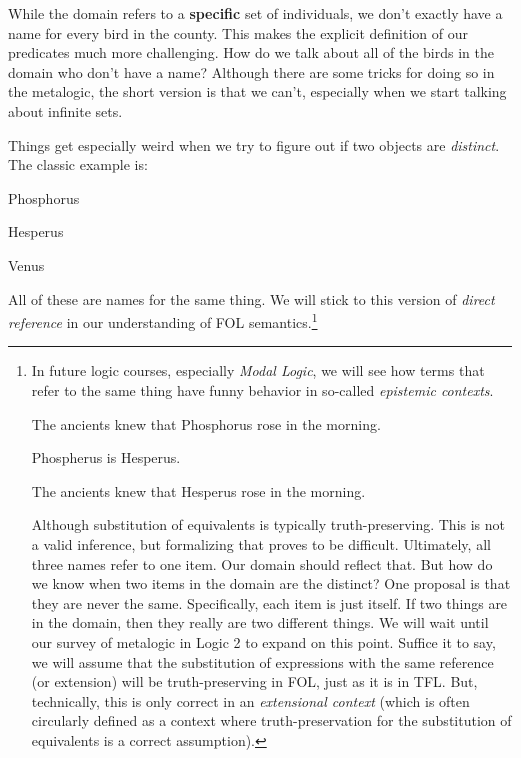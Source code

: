 While the domain refers to a \textbf{specific} set of individuals, we don't
exactly have a name for every bird in the county. This makes the explicit
definition of our predicates much more challenging. How do we talk about all
of the birds in the domain who don't have a name? Although there are some
tricks for doing so in the metalogic, the short version is that we can't,
especially when we start talking about infinite sets.

Things get especially weird when we try to figure out if two objects are
\emph{distinct}. The classic example is:

\begin{argument}
  \item[$p$:] Phosphorus
  \item[$h$:] Hesperus
  \item[$v$:] Venus
\end{argument}

All of these are names for the same thing. We will stick to this version of
\emph{direct reference} in our understanding of FOL semantics.\footnote{

  In future logic courses, especially \emph{Modal Logic}, we will see how terms
  that refer to the same thing have funny behavior in so-called \emph{epistemic
  contexts}.
  
  \begin{argument}
  \item[ ] The ancients knew that Phosphorus rose in the morning.
  \item[ ] Phospherus is Hesperus.
  \item[\therefore] The ancients knew that Hesperus rose in the morning.
  \end{argument}
  
  Although substitution of equivalents is typically truth-preserving. This is
  not a valid inference, but formalizing that proves to be difficult.
  Ultimately, all three names refer to one item. Our domain should reflect that.
  But how do we know when two items in the domain are the distinct? One
  proposal is that they are never the same. Specifically, each item is just
  itself. If two things are in the domain, then they really are two different
  things. We will wait until our survey of metalogic in Logic 2 to expand on
  this point. Suffice it to say, we will assume that the substitution of
  expressions with the same reference (or extension) will be truth-preserving
  in FOL, just as it is in TFL. But, technically, this is only correct in an
  \emph{extensional context} (which is often circularly defined as a context
  where truth-preservation for the substitution of equivalents is a correct
  assumption).
  
}

